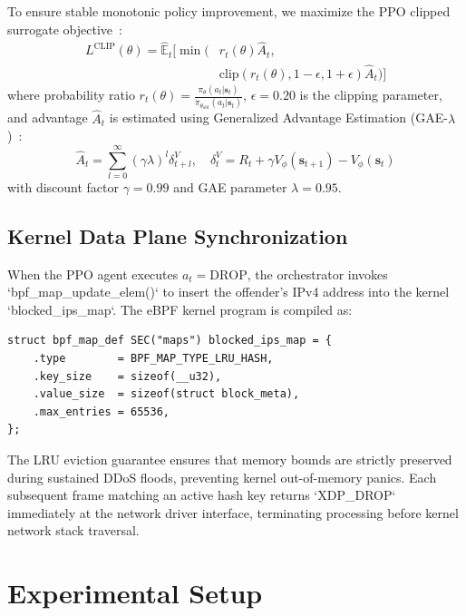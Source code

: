 \documentclass[conference,10pt]{IEEEtran}
\begin{document}
To ensure stable monotonic policy improvement, we maximize the PPO clipped surrogate objective~\cite{schulman2017proximal}:
\begin{align}
L^{\text{CLIP}}(\theta) = \hat{\mathbb{E}}_t \Big[ \min\Big( & r_t(\theta) \hat{A}_t, \nonumber \\
& \text{clip}(r_t(\theta), 1-\epsilon, 1+\epsilon) \hat{A}_t \Big) \Big]
\label{eq:ppo_clip}
\end{align}
where probability ratio $r_t(\theta) = \frac{\pi_\theta(a_t|\mathbf{s}_t)}{\pi_{\theta_{\text{old}}}(a_t|\mathbf{s}_t)}$, $\epsilon = 0.20$ is the clipping parameter, and advantage $\hat{A}_t$ is estimated using Generalized Advantage Estimation (GAE-$\lambda$)~\cite{schulman2016gae}:
\begin{equation}
\hat{A}_t = \sum_{l=0}^{\infty} (\gamma \lambda)^l \delta_{t+l}^V, \quad \delta_t^V = R_t + \gamma V_\phi(\mathbf{s}_{t+1}) - V_\phi(\mathbf{s}_t)
\end{equation}
with discount factor $\gamma = 0.99$ and GAE parameter $\lambda = 0.95$.

\subsection{Kernel Data Plane Synchronization}
When the PPO agent executes $a_t = \text{DROP}$, the orchestrator invokes `bpf_map_update_elem()` to insert the offender's IPv4 address into the kernel `blocked_ips_map`.
The eBPF kernel program is compiled as:
\begin{verbatim}
struct bpf_map_def SEC("maps") blocked_ips_map = {
    .type        = BPF_MAP_TYPE_LRU_HASH,
    .key_size    = sizeof(__u32),
    .value_size  = sizeof(struct block_meta),
    .max_entries = 65536,
};
\end{verbatim}

The LRU eviction guarantee ensures that memory bounds are strictly preserved during sustained DDoS floods, preventing kernel out-of-memory panics. Each subsequent frame matching an active hash key returns `XDP_DROP` immediately at the network driver interface, terminating processing before kernel network stack traversal.

\section{Experimental Setup}
\end{document}
